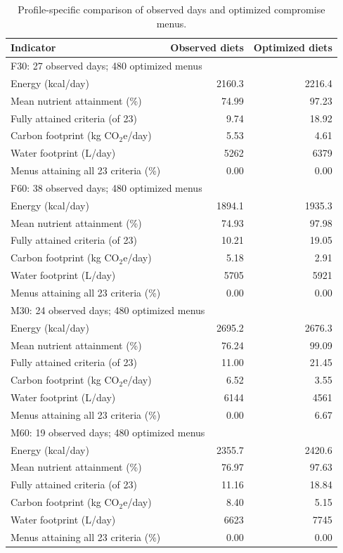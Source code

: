 \begin{table}[pos=h]
\centering\small
\caption{Profile-specific comparison of observed days and optimized compromise menus.}
\label{tab:observed-profiles}
\begin{tabularx}{\textwidth}{Xrr}
\toprule
Indicator & Observed diets & Optimized diets \\
\midrule
\multicolumn{3}{l}{F30: 27 observed days; 480 optimized menus}\\
Energy (kcal/day) & 2160.3 & 2216.4 \\
\midrule
Mean nutrient attainment (\%) & 74.99 & 97.23 \\
\midrule
Fully attained criteria (of 23) & 9.74 & 18.92 \\
\midrule
Carbon footprint (kg CO$_2$e/day) & 5.53 & 4.61 \\
\midrule
Water footprint (L/day) & 5262 & 6379 \\
\midrule
Menus attaining all 23 criteria (\%) & 0.00 & 0.00 \\
\midrule
\multicolumn{3}{l}{F60: 38 observed days; 480 optimized menus}\\
Energy (kcal/day) & 1894.1 & 1935.3 \\
\midrule
Mean nutrient attainment (\%) & 74.93 & 97.98 \\
\midrule
Fully attained criteria (of 23) & 10.21 & 19.05 \\
\midrule
Carbon footprint (kg CO$_2$e/day) & 5.18 & 2.91 \\
\midrule
Water footprint (L/day) & 5705 & 5921 \\
\midrule
Menus attaining all 23 criteria (\%) & 0.00 & 0.00 \\
\midrule
\multicolumn{3}{l}{M30: 24 observed days; 480 optimized menus}\\
Energy (kcal/day) & 2695.2 & 2676.3 \\
\midrule
Mean nutrient attainment (\%) & 76.24 & 99.09 \\
\midrule
Fully attained criteria (of 23) & 11.00 & 21.45 \\
\midrule
Carbon footprint (kg CO$_2$e/day) & 6.52 & 3.55 \\
\midrule
Water footprint (L/day) & 6144 & 4561 \\
\midrule
Menus attaining all 23 criteria (\%) & 0.00 & 6.67 \\
\midrule
\multicolumn{3}{l}{M60: 19 observed days; 480 optimized menus}\\
Energy (kcal/day) & 2355.7 & 2420.6 \\
\midrule
Mean nutrient attainment (\%) & 76.97 & 97.63 \\
\midrule
Fully attained criteria (of 23) & 11.16 & 18.84 \\
\midrule
Carbon footprint (kg CO$_2$e/day) & 8.40 & 5.15 \\
\midrule
Water footprint (L/day) & 6623 & 7745 \\
\midrule
Menus attaining all 23 criteria (\%) & 0.00 & 0.00 \\
\bottomrule
\end{tabularx}
\end{table}
